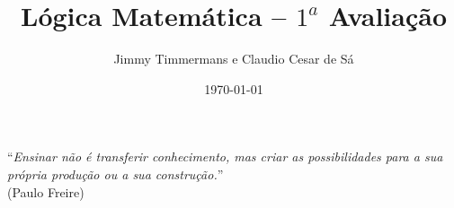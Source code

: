 \documentclass[12pt]{article}
\title{Lógica Matemática -- $1^a$ Avaliação}
\author{Jimmy Timmermans e Claudio Cesar de Sá}
\date{\today}
\begin{document}
\pagestyle{empty}
\maketitle

%


\begin{flushright}
``\textit{Ensinar não é transferir conhecimento, mas criar as possibilidades para a sua própria produção ou a sua construção.}''\\ (Paulo Freire)
\end{flushright}
\end{document}
